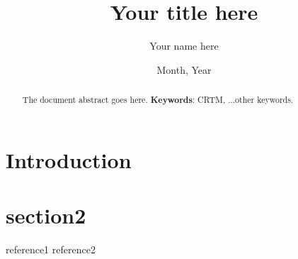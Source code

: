 





\title{Your title here}
\author{Your name here}
\date{Month, Year}



\maketitle

\begin{abstract}
The document abstract goes here.
\textbf{Keywords}: CRTM, ...other keywords.
\end{abstract}


\section{Introduction}
\label{sec:intro}



\section{section2}


\begin{thebibliography}{99}
   reference1
   reference2
\end{thebibliography}



\begin{appendix}
\end{appendix}




